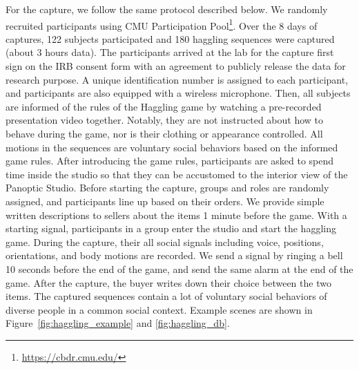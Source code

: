 For the capture, we follow the same protocol described below. We randomly recruited participants using CMU Participation Pool\footnote{\url{https://cbdr.cmu.edu/}}. Over the 8 days of captures, 122 subjects participated and 180 haggling sequences were captured (about 3 hours data). The participants arrived at the lab for the capture first sign on the IRB consent form with an agreement to publicly release the data for research purpose. A unique identification number is assigned to each participant, and participants are also equipped with a wireless microphone.  Then, all subjects are informed of the rules of the Haggling game by watching a pre-recorded presentation video together. Notably, they are not instructed about how to behave during the game, nor is their clothing or appearance controlled. All motions in the sequences are voluntary social behaviors based on the informed game rules. After introducing the game rules, participants are asked to spend time inside the studio so that they can be accustomed to the interior view of the Panoptic Studio. Before starting the capture, groups and roles are randomly assigned, and participants line up based on their orders. We provide simple written descriptions to sellers about the items 1 minute before the game. With a starting signal, participants in a group enter the studio and start the haggling game. During the capture, their all social signals including voice, positions, orientations, and body motions are recorded.  We send a signal by ringing a bell 10 seconds before the end of the game, and send the same alarm at the end of the game. After the capture, the buyer writes down their choice between the two items. The captured sequences contain a lot of voluntary social behaviors of diverse people in a common social context. Example scenes are shown in Figure~\ref{fig:haggling_example} and \ref{fig:haggling_db}.
% 
%





%



